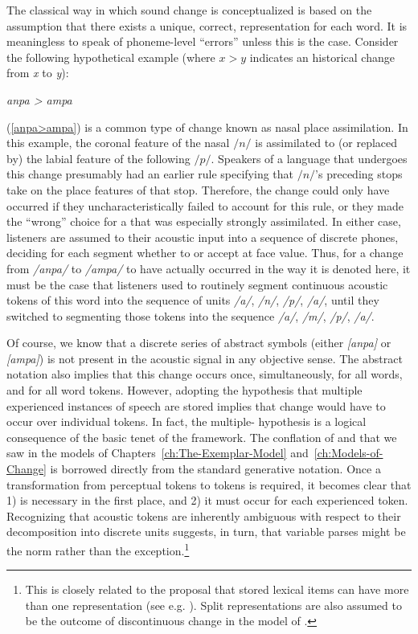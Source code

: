 The classical way in which sound change is conceptualized is based
on the assumption that there exists a unique, correct, 
representation for each word. It is meaningless to speak of phoneme-level
“errors” unless this is the case. Consider the following hypothetical
example (where \emph{$x>y$} indicates an historical change from \emph{x}
to \emph{y}):
\begin{covexamples}
\item \label{anpa>ampa}\emph{anpa \textgreater{} ampa}
\end{covexamples}
(\ref{anpa>ampa}) is a common type of change known as nasal place
assimilation. In this example, the coronal feature of the nasal $/n/$
is assimilated to (or replaced by) the labial feature of the following
$/p/$. Speakers of a language that undergoes this change presumably
had an earlier  rule specifying that $/n/$'s preceding
stops take on the place features of that stop. Therefore, the change
could only have occurred if they uncharacteristically failed to account
for this rule, or they made the “wrong” choice for a 
that was especially strongly assimilated. In either case, listeners
are assumed to  their acoustic input into a sequence of discrete
phones, deciding for each segment whether to  or accept at
face value. Thus, for a change from \emph{/anpa/} to \emph{/ampa/}
to have actually occurred in the way it is denoted here, it must be
the case that listeners used to routinely segment continuous acoustic
tokens of this word into the sequence of units \emph{/a/}, \emph{/n/},
\emph{/p/}, \emph{/a/}, until they switched to segmenting
those tokens into the sequence \emph{/a/}, \emph{/m/}, \emph{/p/},
\emph{/a/}. 

Of course, we know that a discrete series of abstract symbols (either
\emph{[anpa]} or \emph{[ampa]}) is not present in the acoustic
signal in any objective sense. The abstract notation also implies
that this change occurs once, simultaneously, for all words, and for
all word tokens. However, adopting the hypothesis that multiple experienced
instances of speech are stored implies that change would have to occur
over individual tokens. In fact, the multiple- hypothesis is
a logical consequence of the basic tenet of the  framework.
The conflation of  and  that we saw in the  models of Chapters~\ref{ch:The-Exemplar-Model} and~\ref{ch:Models-of-Change}
is borrowed directly from the standard generative notation. Once a
transformation from perceptual tokens to  tokens is required,
it becomes clear that 1)  is necessary in the first place,
and 2) it must occur for each experienced token. Recognizing
that acoustic tokens are inherently ambiguous with respect to their
decomposition into discrete units suggests, in turn, that variable
parses might be the norm rather than the exception.\footnote{This is closely related to the proposal that stored lexical items
can have more than one representation (see e.g. \citealp{hooper1976word,Janda2008,Bybee2001}).
Split representations are also assumed to be the outcome of discontinuous
 change in the model of \citet{Garrett2013}.} 

